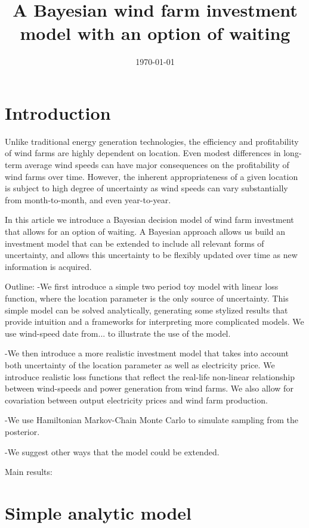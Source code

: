 \documentclass[11pt]{article}
\title{A Bayesian wind farm investment model with an option of waiting}
\date{\today}
\begin{document}
 \begin{spacing}{1} %
	\maketitle

\begin{abstract}
 
\end{abstract}

 \end{spacing}

\section{Introduction}
Unlike traditional energy generation technologies, the efficiency and profitability of wind farms are highly dependent on location. Even modest differences in long-term average wind speeds can have major consequences on the profitability of wind farms over time. However, the inherent appropriateness of a given location is subject to high degree of uncertainty as wind speeds can vary substantially from month-to-month, and even year-to-year. 

In this article we introduce a Bayesian decision model of wind farm investment that allows for an option of waiting. A Bayesian approach allows us build an investment model that can be extended to include all relevant forms of uncertainty, and allows this uncertainty to be flexibly updated over time as new information is acquired.

Outline:
-We first introduce a simple two period toy model with linear loss function, where the location parameter is the only source of uncertainty. This simple model can be solved analytically, generating some stylized results that provide intuition and a frameworks for interpreting more complicated models. We use wind-speed date from... to illustrate the use of the model. 

-We then introduce a more realistic investment model that takes into account both uncertainty of the location parameter as well as electricity price. We introduce realistic loss functions that reflect the real-life non-linear relationship between wind-speeds and power generation from wind farms. We also allow for covariation between output electricity prices and wind farm production. 

-We use Hamiltonian Markov-Chain Monte Carlo to simulate sampling from the posterior. 

-We suggest other ways that the model could be extended. 

Main results:

\section{Simple analytic model}

\
\end{document}
